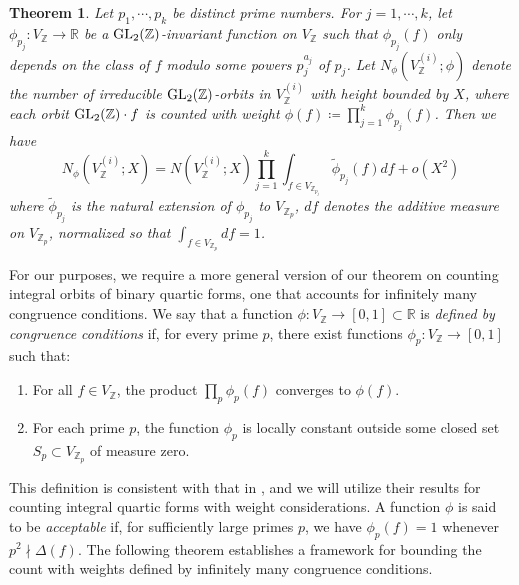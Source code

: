 \documentclass{article}
\def\GL{{\rm GL}}
\newtheorem{theorem}{Theorem}[section]
\begin{document}
\begin{theorem}\label{conqgruent-counting}
    Let $p_1, \cdots, p_k$ be distinct prime numbers. For $j=1,\cdots,k$, let $\phi_{p_j}:V_{\mathbb{Z}} \rightarrow \mathbb{R}$ be a $\GL_2(\mathbb{Z})$-invariant function on $V_{\mathbb{Z}}$ such that $\phi_{p_j}(f)$ only depends on the class of $f$ modulo some powers $p_j^{a_j}$ of $p_j$. Let $N_{\phi}(V_{\mathbb{Z}}^{(i)};\phi)$ denote the number of irreducible $\GL_2(\mathbb{Z})$-orbits in $V_{\mathbb{Z}}^{(i)}$ with height bounded by $X$, where each orbit $\GL_2(\mathbb{Z}) \cdot f$ is counted with weight $\phi(f) \coloneqq \prod_{j=1}^{k}\phi_{p_j}(f)$. Then we have
    \begin{equation*}
        N_{\phi}(V_{\mathbb{Z}}^{(i)};X)=N(V_{\mathbb{Z}}^{(i)};X)\prod_{j=1}^{k}\int_{f\in V_{\mathbb{Z}_{p_j}}} \tilde{\phi}_{p_j}(f) df + o(X^2)
    \end{equation*}
    where $\tilde{\phi}_{p_j}$ is the natural extension of $\phi_{p_j}$ to $V_{\mathbb{Z}_p}$, $df$ denotes the additive measure on $V_{\mathbb{Z}_{p}}$, normalized so that $\int_{f\in V_{\mathbb{Z}_p}}df=1$.
\end{theorem}


For our purposes, we require a more general version of our theorem on counting integral orbits of binary quartic forms, one that accounts for infinitely many congruence conditions. We say that a function $\phi: V_{\mathbb{Z}} \to [0,1] \subset \mathbb{R}$ is \textit{defined by congruence conditions} if, for every prime $p$, there exist functions $\phi_p: V_{\mathbb{Z}} \to [0,1]$ such that:



\begin{enumerate}
    \item[(1)] For all $f\in V_{\mathbb{Z}}$, the product $\prod_{p}\phi_p(f)$ converges to $\phi(f)$.
    \item[(2)] For each prime $p$, the function $\phi_p$ is locally constant outside some closed set $S_p \subset V_{\mathbb{Z}_p}$ of measure zero.
\end{enumerate}
This definition is consistent with that in \cite{main}, and we will utilize their results for counting integral quartic forms with weight considerations. A function $\phi$ is said to be \textit{acceptable} if, for sufficiently large primes $p$, we have $\phi_p(f) = 1$ whenever $p^2 \nmid \Delta(f)$. The following theorem establishes a framework for bounding the count with weights defined by infinitely many congruence conditions.
\end{document}
